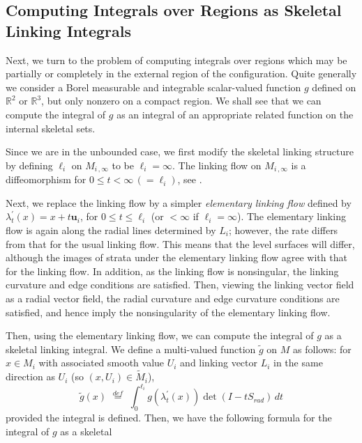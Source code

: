 \documentclass[10pt]{amsart}
\theoremstyle{definition}
\theoremstyle{definition}
\numberwithin{equation}{section}
\newcommand{\R}{{\mathbb R}}
\def \bu {\mathbf {u}}
\def \gl {\lambda}
\begin{document}
\subsection*{Computing Integrals over Regions as Skeletal Linking 
Integrals} 
\par
Next, we turn to the problem of computing integrals over regions which 
may be partially or completely in the external region of the configuration.  
Quite generally we consider a Borel measurable and integrable 
scalar-valued function $g$ defined on $\R^2$ or $\R^3$, but only nonzero 
on a compact region.  We shall see that we can compute the integral of $g$ 
as an integral of an appropriate related function on the internal skeletal 
sets.  \par 
Since we are in the unbounded case, we first modify the skeletal linking 
structure by defining $\ell_i$ on $M_{i\, ,\infty}$ to be $\ell_i = \infty$.  
The linking flow on $M_{i\, ,\infty}$ is a 
diffeomorphism for $0 \leq t < \infty \,(= \ell_i)$, see 
\cite[Prop. 14.11]{DG}.  \par 
Next, we replace the linking flow by a simpler {\it elementary 
linking flow} defined by $\gl^{\prime}_t(x) = x + t \bu_i$, for $0 \leq t 
\leq \ell_i$ (or $< \infty$ if $\ell_i= \infty$).  The elementary linking 
flow is again along the radial lines determined by $L_i$; however, the rate 
differs from that for the usual linking flow.  This means that the level 
surfaces will differ, although the images of strata under the elementary 
linking flow agree with that for the linking flow.  In addition, as the 
linking flow is nonsingular, the linking curvature and edge conditions are 
satisfied.  Then, viewing the linking vector field as a radial vector field, 
the radial curvature and edge curvature conditions are satisfied, and hence 
imply the nonsingularity of the elementary linking flow.  
\par 
Then, using the elementary linking flow, we can compute the integral of 
$g$ as a skeletal linking integral.  We define a multi-valued function 
$\tilde g$ on $M$ as follows: for $x \in M_i$ with associated smooth value 
$U_i$ and linking vector $L_i$ in the same direction as $U_i$ (so $(x, U_i) 
\in \tilde M_i$),  
\begin{equation}
\label{EqnII5.6}
 \tilde g(x) \,\, \overset{def}{=} \,\, \int_{0}^{\ell_i} g (\gl^{\prime}_t(x)) 
\det(I - t S_{rad})\, dt  
\end{equation}
provided the integral is defined.  
Then, we have the following formula for the integral of $g$ as a skeletal 
\end{document}
